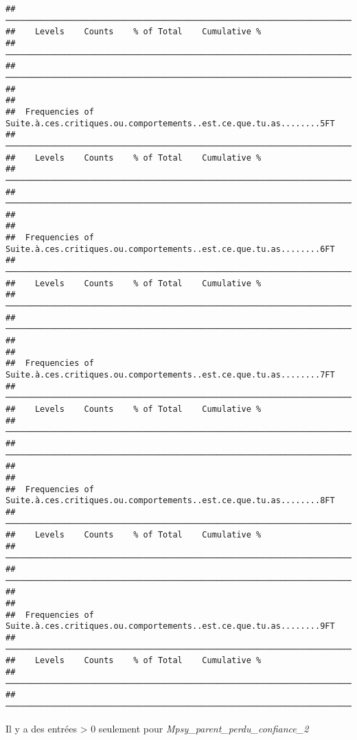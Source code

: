 \documentclass[
]{article}
\begin{document}
\begin{verbatim}
##  ────────────────────────────────────────────────────────────────────────────────── 
##    Levels    Counts    % of Total    Cumulative %   
##  ────────────────────────────────────────────────────────────────────────────────── 
##  ────────────────────────────────────────────────────────────────────────────────── 
## 
## 
##  Frequencies of Suite.à.ces.critiques.ou.comportements..est.ce.que.tu.as........5FT 
##  ────────────────────────────────────────────────────────────────────────────────── 
##    Levels    Counts    % of Total    Cumulative %   
##  ────────────────────────────────────────────────────────────────────────────────── 
##  ────────────────────────────────────────────────────────────────────────────────── 
## 
## 
##  Frequencies of Suite.à.ces.critiques.ou.comportements..est.ce.que.tu.as........6FT 
##  ────────────────────────────────────────────────────────────────────────────────── 
##    Levels    Counts    % of Total    Cumulative %   
##  ────────────────────────────────────────────────────────────────────────────────── 
##  ────────────────────────────────────────────────────────────────────────────────── 
## 
## 
##  Frequencies of Suite.à.ces.critiques.ou.comportements..est.ce.que.tu.as........7FT 
##  ────────────────────────────────────────────────────────────────────────────────── 
##    Levels    Counts    % of Total    Cumulative %   
##  ────────────────────────────────────────────────────────────────────────────────── 
##  ────────────────────────────────────────────────────────────────────────────────── 
## 
## 
##  Frequencies of Suite.à.ces.critiques.ou.comportements..est.ce.que.tu.as........8FT 
##  ────────────────────────────────────────────────────────────────────────────────── 
##    Levels    Counts    % of Total    Cumulative %   
##  ────────────────────────────────────────────────────────────────────────────────── 
##  ────────────────────────────────────────────────────────────────────────────────── 
## 
## 
##  Frequencies of Suite.à.ces.critiques.ou.comportements..est.ce.que.tu.as........9FT 
##  ────────────────────────────────────────────────────────────────────────────────── 
##    Levels    Counts    % of Total    Cumulative %   
##  ────────────────────────────────────────────────────────────────────────────────── 
##  ──────────────────────────────────────────────────────────────────────────────────
\end{verbatim}

Il y a des entrées \textgreater{} 0 seulement pour
\emph{Mpsy\_parent\_perdu\_confiance\_2}
\end{document}

